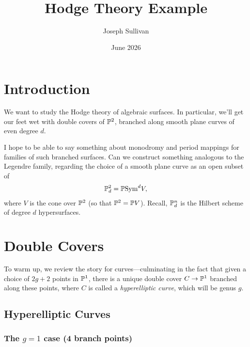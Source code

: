 \documentclass[12pt]{article}
\title{Hodge Theory Example}
\author{Joseph Sullivan}
\date{June 2026}
\begin{document}
\maketitle

\tableofcontents

\section{Introduction}

We want to study the Hodge theory of algebraic surfaces. In particular, we'll get our feet wet with double covers of $\P^2$, branched along smooth plane curves of even degree $d$.

I hope to be able to say something about monodromy and period mappings for families of such branched surfaces. Can we construct something analogous to the Legendre family, regarding the choice of a smooth plane curve as an open subset of
\[\P^2_d = \P \Sym^d V,\]
where $V$ is the cone over $\P^2$ (so that $\P^2 = \P V$). Recall, $\P^n_d$ is the Hilbert scheme of degree $d$ hypersurfaces.



\section{Double Covers}

To warm up, we review the story for curves---culminating in the fact that given a choice of $2g+2$ points in $\P^1$, there is a unique double cover $C\to \P^1$ branched along these points, where $C$ is called a \textit{hyperelliptic curve}, which will be genus $g$.

\subsection{Hyperelliptic Curves}

\subsubsection{The \texorpdfstring{$g=1$}{g=1} case (4 branch points)}
\end{document}
